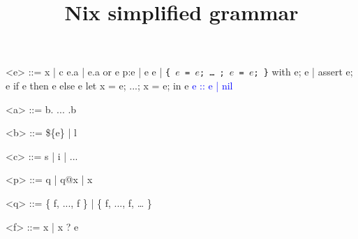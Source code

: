 \documentclass{article}
\title{Nix simplified grammar}
\date{}
\begin{document}
\maketitle{}

\begin{grammar}
<e> ::=
    x | c
  \alt e.a | e.a or e
  \alt p:e | e e
  \alt [ e \ldots{} e ] | \texttt{\{ $e$ = $e$; \ldots{} ; $e$ = $e$; \}}
  \alt with e; e | assert e; e
  \alt if e then e else e
  \alt let x = e; ...; x = e; in e
  \textcolor{blue}{\alt e :: e | nil}

<a> ::= b. ... .b

<b> ::= \$\{e\} | l

<c> ::= s | i | ...

<p> ::= q | q@x | x

<q> ::= \{ f, ..., f \} | \{ f, ..., f, … \}

<f> ::= x | x ? e

\end{grammar}
\end{document}

